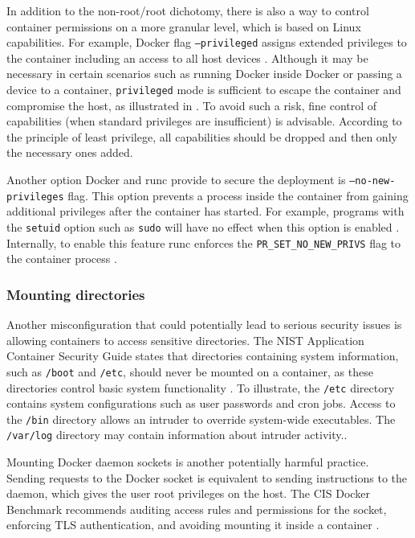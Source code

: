 In addition to the non-root/root dichotomy, there is also a way to control container permissions on a more granular level, which is based on Linux capabilities. For example, Docker flag \texttt{--privileged} assigns extended privileges to the container including an access to all host devices \cite{d:dockerrun}. Although it may be necessary in certain scenarios such as running Docker inside Docker or passing a device to a container, \texttt{privileged} mode is sufficient to escape the container and compromise the host, as illustrated in \cite{b:escape}. To avoid such a risk, fine control of capabilities (when standard privileges are insufficient) is advisable. According to the principle of least privilege, all capabilities should be dropped and then only the necessary ones added.

Another option Docker and runc provide to secure the deployment is \linebreak \texttt{--no-new-privileges} flag. This option prevents a process inside the container from gaining additional privileges after the container has started. For example, programs with the \texttt{setuid} option such as \texttt{sudo} will have no effect when this option is enabled \cite{b:nonewpriv}. Internally, to enable this feature runc enforces the \texttt{PR\_SET\_NO\_NEW\_PRIVS} flag to the container process \cite{d:kernel1}. 

\subsubsection*{Mounting directories}

Another misconfiguration that could potentially lead to serious security issues is allowing containers to access sensitive directories. The NIST Application Container Security Guide states that directories containing system information, such as \texttt{/boot} and \texttt{/etc}, should never be mounted on a container, as these directories control basic system functionality \cite{nist:docker}. To illustrate, the \texttt{/etc} directory contains system configurations such as user passwords and cron jobs. Access to the \texttt{/bin} directory allows an intruder to override system-wide executables. The \texttt{/var/log} directory may contain information about intruder activity.\cite{book:rice}.

Mounting Docker daemon sockets is another potentially harmful practice. Sending requests to the Docker socket is equivalent to sending instructions to the daemon, which gives the user root privileges on the host. The CIS Docker Benchmark recommends auditing access rules and permissions for the socket, enforcing TLS authentication, and avoiding mounting it inside a container \cite{cis:docker}.

